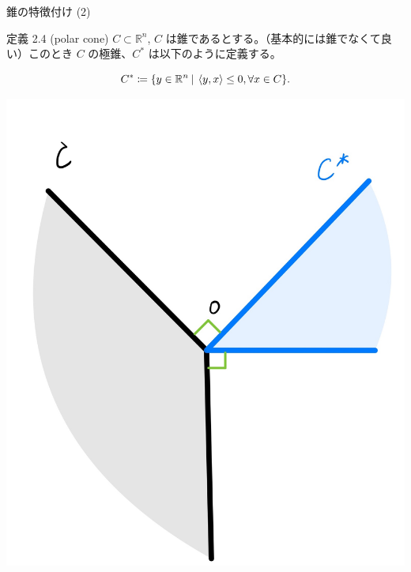 \documentclass[aspectratio=169, dvipdfmx, 11pt]{beamer} %
\begin{document}
\begin{frame}{錐の特徴付け (2)}
  \begin{block}{定義 2.4 (polar cone) }
    $C \subset \mathbb{R}^n$, $C$ は錐であるとする。（基本的には錐でなくて良い）このとき $C$ の極錐、$C^*$ は以下のように定義する。

    \begin{equation}
      C^* \coloneqq \{y \in \mathbb{R}^n \:|\: \left\langle y,x \right\rangle \leq 0 , \forall x \in C \}. \notag
    \end{equation}

  \end{block}
  \centering
  \includegraphics[keepaspectratio, scale=0.06]{figures/polar_cone.jpg}
\end{frame}
\end{document}
